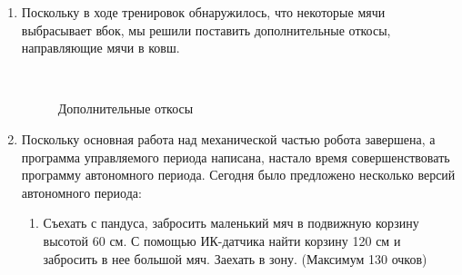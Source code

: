 \begin{enumerate}
\begin{enumerate}
		\item Поскольку в ходе тренировок обнаружилось, что некоторые мячи выбрасывает вбок, мы решили поставить дополнительные откосы, направляющие мячи в ковш.
		\begin{figure}[H]
			\begin{minipage}[h]{0.2\linewidth}
				\center  
			\end{minipage}
			\begin{minipage}[h]{0.6\linewidth}
				\caption{Дополнительные откосы}
			\end{minipage}
		\end{figure}
		
        \item Поскольку основная работа над механической частью робота завершена, а программа управляемого периода написана, настало время совершенствовать программу автономного периода. Сегодня было предложено несколько версий автономного периода:
        \begin{enumerate}
        	
        	\item Съехать с пандуса, забросить маленький мяч в подвижную корзину высотой 60 см. С помощью ИК-датчика найти корзину 120 см и забросить в нее большой мяч. Заехать в зону. (Максимум 130 очков)
        	

\end{enumerate}
\end{enumerate}
\end{enumerate}
